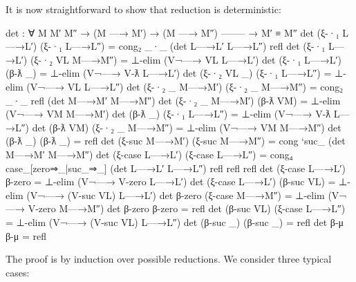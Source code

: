 It is now straightforward to show that reduction is deterministic:

\begin{fence}
\begin{code}
det : ∀ {M M′ M″}
  → (M —→ M′)
  → (M —→ M″)
    --------
  → M′ ≡ M″
det (ξ-·₁ L—→L′)   (ξ-·₁ L—→L″)     =  cong₂ _·_ (det L—→L′ L—→L″) refl
det (ξ-·₁ L—→L′)   (ξ-·₂ VL M—→M″)  =  ⊥-elim (V¬—→ VL L—→L′)
det (ξ-·₁ L—→L′)   (β-ƛ _)          =  ⊥-elim (V¬—→ V-ƛ L—→L′)
det (ξ-·₂ VL _)    (ξ-·₁ L—→L″)     =  ⊥-elim (V¬—→ VL L—→L″)
det (ξ-·₂ _ M—→M′) (ξ-·₂ _ M—→M″)   =  cong₂ _·_ refl (det M—→M′ M—→M″)
det (ξ-·₂ _ M—→M′) (β-ƛ VM)         =  ⊥-elim (V¬—→ VM M—→M′)
det (β-ƛ _)        (ξ-·₁ L—→L″)     =  ⊥-elim (V¬—→ V-ƛ L—→L″)
det (β-ƛ VM)       (ξ-·₂ _ M—→M″)   =  ⊥-elim (V¬—→ VM M—→M″)
det (β-ƛ _)        (β-ƛ _)          =  refl
det (ξ-suc M—→M′)  (ξ-suc M—→M″)    =  cong `suc_ (det M—→M′ M—→M″)
det (ξ-case L—→L′) (ξ-case L—→L″)   =  cong₄ case_[zero⇒_|suc_⇒_]
                                         (det L—→L′ L—→L″) refl refl refl
det (ξ-case L—→L′) β-zero           =  ⊥-elim (V¬—→ V-zero L—→L′)
det (ξ-case L—→L′) (β-suc VL)       =  ⊥-elim (V¬—→ (V-suc VL) L—→L′)
det β-zero         (ξ-case M—→M″)   =  ⊥-elim (V¬—→ V-zero M—→M″)
det β-zero         β-zero           =  refl
det (β-suc VL)     (ξ-case L—→L″)   =  ⊥-elim (V¬—→ (V-suc VL) L—→L″)
det (β-suc _)      (β-suc _)        =  refl
det β-μ            β-μ              =  refl
\end{code}
\end{fence}

The proof is by induction over possible reductions. We consider three
typical cases:

